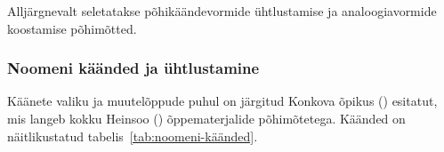 \documentclass[12pt,a4paper]{article}
\newcommand{\msd}[1]{\textsc{#1}}
\begin{document}
Alljärgnevalt seletatakse põhikäändevormide ühtlustamise ja analoogiavormide koostamise põhimõtted. %


\subsubsection{Noomeni käänded ja ühtlustamine}


Käänete valiku ja muutelõppude puhul on järgitud Konkova õpikus (\citeyear[10]{konkova_vaddceeli_2014}) esitatut, mis langeb kokku Heinsoo (\citeyear[88]{heinsoo_vadsonakopittoja_2015}) õppe\-materjalide põhimõtetega. Käänded on näitlikustatud tabelis~\ref{tab:noomeni-käänded}.
\end{document}
